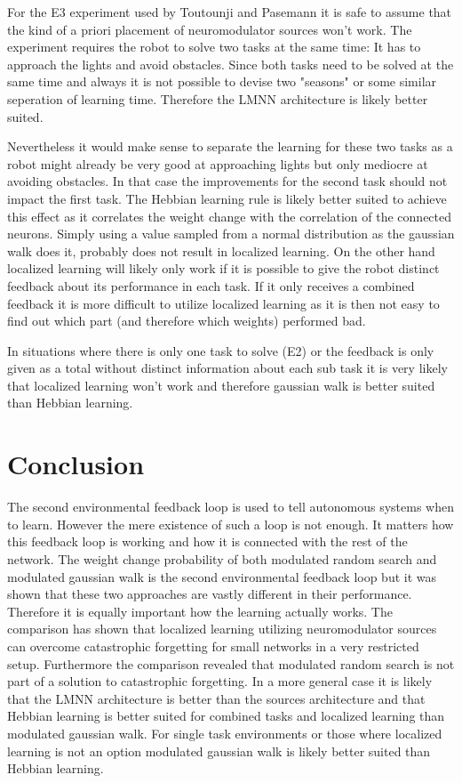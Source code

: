 \documentclass[12pt,twoside]{scrartcl}
\theoremstyle{plain}
\theoremstyle{definition}
\theoremstyle{remark}
\begin{document}
For the E3 experiment used by Toutounji and Pasemann it is safe to assume that
the kind of a priori placement of neuromodulator sources won't work. The experiment
requires the robot to solve two tasks at the same time: It has
to approach the lights and avoid obstacles. Since both tasks need to be solved
at the same time and always it is not possible to devise two "seasons" or some
similar seperation of learning time. Therefore the LMNN architecture is likely
better suited.

Nevertheless it would make sense to separate the learning for
these two tasks as a robot might already be very good at approaching lights but
only mediocre at avoiding obstacles. In that case the improvements for the second
task should not impact the first task. The Hebbian learning rule is likely
better suited to achieve this effect as it correlates the weight change with
the correlation of the connected neurons. Simply using a value sampled from a
normal distribution as the gaussian walk does it, probably does not result in
localized learning. On the other hand localized learning will likely only work
if it is possible to give the robot distinct feedback about its performance in
each task. If it only receives a combined feedback it is more difficult to
utilize localized learning as it is then not easy to find out which part (and
therefore which weights) performed bad.

In situations where there is only one task to solve (E2) or the feedback is only
given as a total without distinct information about each sub task it is very
likely that localized learning won't work and therefore gaussian walk is better
suited than Hebbian learning.

\section{Conclusion}
\label{sec:concl}

The second environmental feedback loop is used to tell autonomous systems
when to learn. However the mere existence of such a loop is not enough. It matters
how this feedback loop is working and how it is connected with the rest of the
network. The weight change probability of both modulated random search and
modulated gaussian walk is the second environmental feedback loop but it was shown
that these two approaches are vastly different in their performance.
Therefore it is equally important how the learning actually works. The comparison
has shown that localized learning utilizing neuromodulator sources can overcome
catastrophic forgetting for small networks in a very restricted setup.
Furthermore the comparison revealed that modulated random search is not part of
a solution to catastrophic forgetting. In a more general case it is likely that
the LMNN architecture is better than the sources architecture and that Hebbian
learning is better suited for combined tasks and localized learning than modulated
gaussian walk. For single task environments or those where localized learning is
not an option modulated gaussian walk is likely better suited than Hebbian learning.
\end{document}
